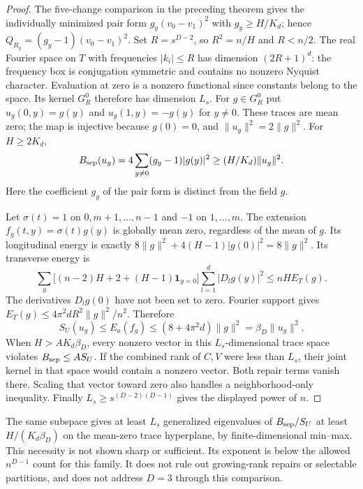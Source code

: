 \begin{proof}
The five-change comparison in the preceding theorem gives the individually
minimized pair form $g_y(v_0-v_1)^2$ with $g_y\ge H/K_d$; hence
$Q_{R_y}=(g_y-1)(v_0-v_1)^2$.
Set $R=s^{D-2}$, so $R^2=n/H$ and $R<n/2$. The real Fourier space on $T$
with frequencies $|k_i|\le R$ has dimension $(2R+1)^d$: the frequency
box is conjugation symmetric and contains no nonzero Nyquist character.
Evaluation at zero is a nonzero functional since constants belong to the
space. Its kernel $G_R^0$ therefore has dimension $L_s$.
For $g\in G_R^0$ put $u_g(0,y)=g(y)$ and $u_g(1,y)=-g(y)$ for $y\ne0$.
These traces are mean zero; the map is injective because $g(0)=0$, and
$\|u_g\|^2=2\|g\|^2$. For $H\ge2K_d$,
\[
 B_{\rm sep}(u_g)=4\sum_{y\ne0}(g_y-1)|g(y)|^2
 \ge (H/K_d)\|u_g\|^2.
\]
Here the coefficient $g_y$ of the pair form is distinct from the field $g$.

Let $\sigma(t)=1$ on $0,m+1,\ldots,n-1$ and $-1$ on $1,\ldots,m$.
The extension $f_g(t,y)=\sigma(t)g(y)$ is globally mean zero, regardless of
the mean of $g$. Its longitudinal energy is exactly
$8\|g\|^2+4(H-1)|g(0)|^2=8\|g\|^2$. Its transverse energy is
\[
 \sum_y\big[(n-2)H+2+(H-1)\mathbf1_{y=0}\big]
       \sum_{l=1}^d|D_lg(y)|^2\le nH E_T(g).
\]
The derivatives $D_lg(0)$ have not been set to zero. Fourier support gives
$E_T(g)\le4\pi^2dR^2\|g\|^2/n^2$. Therefore
\[
 S_U(u_g)\le E_a(f_g)\le(8+4\pi^2d)\|g\|^2
                      =\beta_D\|u_g\|^2.
\]
When $H>AK_d\beta_D$, every nonzero vector in this $L_s$-dimensional
trace space violates $B_{\rm sep}\le A S_U$. If the combined rank of
$C,V$ were less than $L_s$, their joint kernel in that space would contain
a nonzero vector. Both repair terms vanish there. Scaling that vector
toward zero also handles a neighborhood-only inequality. Finally
$L_s\ge s^{(D-2)(D-1)}$ gives the displayed power of $n$.
\end{proof}
The same subspace gives at least $L_s$ generalized eigenvalues of
$B_{\rm sep}/S_U$ at least $H/(K_d\beta_D)$ on the mean-zero trace
hyperplane, by finite-dimensional min--max. This necessity is not shown
sharp or sufficient. Its exponent is below the allowed $n^{D-1}$ count
for this family. It does not rule out growing-rank repairs or selectable
partitions, and does not address $D=3$ through this comparison.

